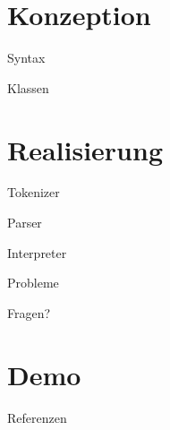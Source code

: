 \section{Konzeption}
  \begin{frame}{Syntax}
  \end{frame}

  \begin{frame}{Klassen}
  \end{frame}

\section{Realisierung}
  \begin{frame}{Tokenizer}
  \end{frame}
  \begin{frame}{Parser} %
  \end{frame}
  \begin{frame}{Interpreter}
  \end{frame}
  \begin{frame}{Probleme} %
  \end{frame}

  \begin{frame}[standout]
    Fragen?
  \end{frame}

  \section{Demo}

  \appendix
  \begin{frame}[allowframebreaks]{Referenzen}
  \end{frame}



